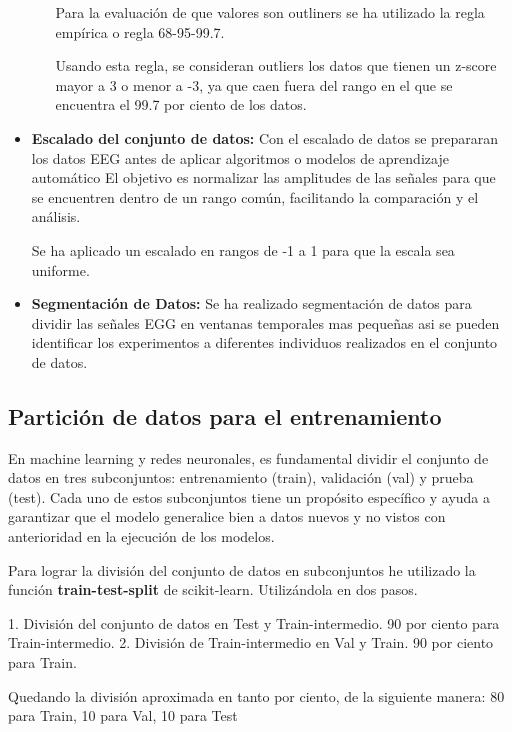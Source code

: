 \begin{itemize}
\begin{itemize}
	
	Para la evaluación de que valores son outliners se ha utilizado la regla empírica o regla
	68-95-99.7.~\cite{outliners:empirica}

Usando esta regla, se consideran outliers los datos que tienen un z-score mayor a 3 o menor a -3, ya que caen fuera del rango en el que se encuentra el 99.7 por ciento de los datos.
	\end{itemize}

	\item
	\textbf{Escalado del conjunto de datos:}	
	Con el escalado de datos se prepararan los datos EEG antes de aplicar algoritmos o modelos de aprendizaje automático El objetivo es normalizar las amplitudes de las señales para que se encuentren dentro de un rango común, facilitando la comparación y el análisis.

Se ha aplicado un escalado en rangos de -1 a 1 para que la escala sea uniforme.

 
	\item
	\textbf{Segmentación de Datos:}	
	Se ha realizado segmentación de datos para dividir las señales EGG en ventanas temporales mas pequeñas asi se pueden identificar los experimentos a diferentes individuos realizados en el conjunto de datos.

\end{itemize}


\subsection{Partición de datos para el entrenamiento}

En machine learning y redes neuronales, es fundamental dividir el conjunto de datos en tres subconjuntos: entrenamiento (train), validación (val) y prueba (test). Cada uno de estos subconjuntos tiene un propósito específico y ayuda a garantizar que el modelo generalice bien a datos nuevos y no vistos con anterioridad en la ejecución de los modelos. 

Para lograr la división del conjunto de datos en subconjuntos he utilizado la función \textbf{train-test-split} de scikit-learn. Utilizándola en dos pasos.

1. División del conjunto de datos en Test y Train-intermedio. 90 por ciento para Train-intermedio.
2. División de Train-intermedio en Val y Train. 90 por ciento para Train.

Quedando la división aproximada en tanto por ciento, de la siguiente manera:
80 para Train, 10 para Val, 10 para Test

